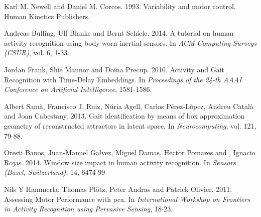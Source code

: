 \documentclass[a0paper,portrait]{baposter}
\begin{document}
\begin{poster}
{\begin{thebibliography}{1}
  Karl M. Newell and Daniel M. Corcos. 1993.
  \newblock Variability and motor control.
  \newblock Human Kinetics Publishers.


  Andreas Bulling, Ulf Blanke and Bernt Schiele. 2014.
  \newblock A tutorial on human activity recognition using body-worn inertial sensors.
  \newblock In {\em ACM Computing Surveys (CSUR)}, vol. 6, 1-33.

  Jordan Frank, Shie Mannor and Doina Precup. 2010.
  \newblock Activity and Gait Recognition with Time-Delay Embeddings.
  \newblock In {\em Proceedings of the 24-th AAAI Conference on Artificial Intelligence}, 1581-1586.

  Albert Samà, Francisco J. Ruiz, Núria Agell, Carlos Pérez-López, Andreu Català and Joan Cabestany. 2013.
  \newblock Gait identification by means of box approximation geometry of reconstructed attractors in latent space.
  \newblock In {\em Neurocomputing}, vol. 121, 79-88.



   Oresti Banos, Juan-Manuel Galvez, Miguel Damas, Hector Pomares and , Ignacio Rojas. 2014.
   \newblock Window size impact in human activity recognition.
   \newblock In {\em Sensors (Basel, Switzerland)}, 14, 6474-99


%



  Nils Y Hammerla, Thomas Plötz, Peter Andras and Patrick Olivier. 2011.
  \newblock Assessing Motor Performance with pca.
  \newblock In {\em International Workshop on Frontiers in Activity Recognition using Pervasive Sensing}, 18-23.



\end{thebibliography}
}


\end{poster}
\end{document}
